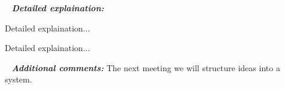    \newline
  \textit{\textbf{Detailed explaination:}}
  \begin{enumerate*}
  	\item Detailed explaination...
  	\begin{figure}[H]
  		\begin{minipage}[h]{1\linewidth}
  			\caption{}
  		\end{minipage}
  	\end{figure}
  	
  	\item Detailed explaination...
  	\begin{figure}[H]
  		\begin{minipage}[h]{1\linewidth}
  			\caption{}
  		\end{minipage}
  	\end{figure}
  	
  \end{enumerate*}
  
   \newline
  \textit{\textbf{Additional comments:}} The next meeting we will structure ideas into a system.
  
\fillpage
